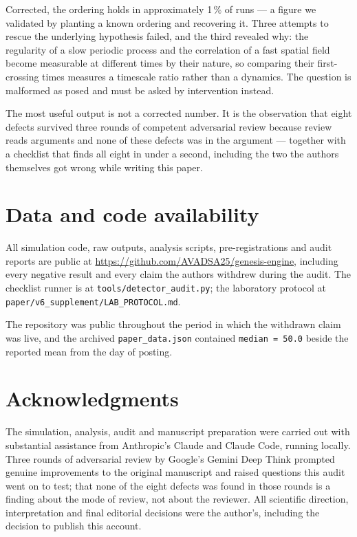 \documentclass[11pt,letterpaper]{article}
\begin{document}
Corrected, the ordering holds in approximately 1\,\% of runs --- a figure
we validated by planting a known ordering and recovering it. Three
attempts to rescue the underlying hypothesis failed, and the third
revealed why: the regularity of a slow periodic process and the
correlation of a fast spatial field become measurable at different
times by their nature, so comparing their first-crossing times measures
a timescale ratio rather than a dynamics. The question is malformed as
posed and must be asked by intervention instead.

The most useful output is not a corrected number. It is the observation
that eight defects survived three rounds of competent adversarial review
because review reads arguments and none of these defects was in the
argument --- together with a checklist that finds all eight in under a
second, including the two the authors themselves got wrong while
writing this paper.



\section*{Data and code availability}

All simulation code, raw outputs, analysis scripts, pre-registrations
and audit reports are public at
\url{https://github.com/AVADSA25/genesis-engine}, including every
negative result and every claim the authors withdrew during the audit.
The checklist runner is at \texttt{tools/detector\_audit.py}; the
laboratory protocol at \texttt{paper/v6\_supplement/LAB\_PROTOCOL.md}.

The repository was public throughout the period in which the withdrawn
claim was live, and the archived \texttt{paper\_data.json} contained
\texttt{median = 50.0} beside the reported mean from the day of posting.

\section*{Acknowledgments}

The simulation, analysis, audit and manuscript preparation were carried
out with substantial assistance from Anthropic's Claude and Claude Code,
running locally. Three rounds of adversarial review by Google's Gemini
Deep Think prompted genuine improvements to the original manuscript and
raised questions this audit went on to test; that none of the eight
defects was found in those rounds is a finding about the mode of review,
not about the reviewer. All scientific direction, interpretation and
final editorial decisions were the author's, including the decision to
publish this account.
\end{document}
